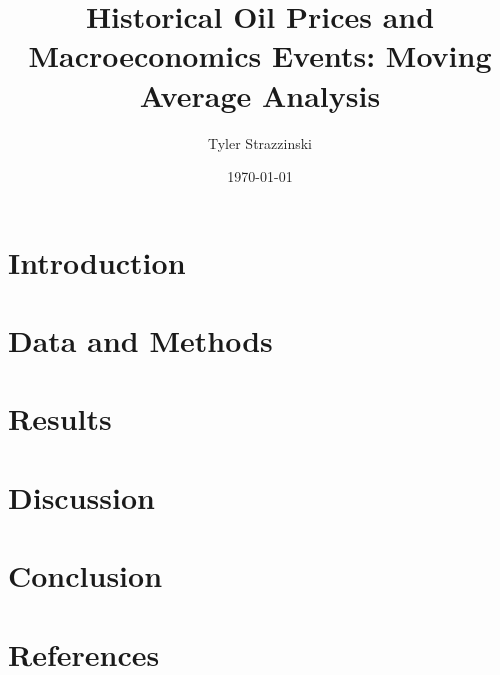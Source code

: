 \documentclass[12pt]{article}
\title{Historical Oil Prices and Macroeconomics Events: Moving Average Analysis}
\author{Tyler Strazzinski}
\date{\today}
\begin{document}
\maketitle

\begin{abstract}

\end{abstract}

\section{Introduction}


\section{Data and Methods}


\section{Results}


\section{Discussion}


\section{Conclusion}


\section{References}

\end{document}
